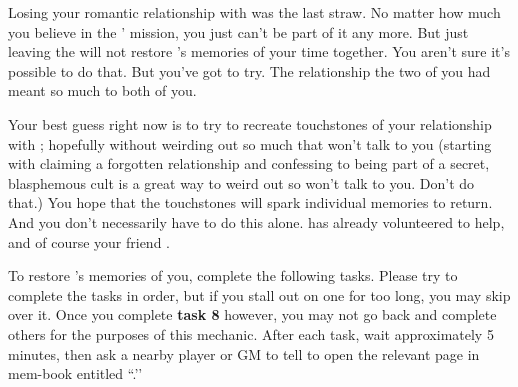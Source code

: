 \documentclass[green]{GL2020}
\begin{document}
\name{\gRestoringLove{}}

Losing your romantic relationship with \cHeadScientist{\full} was the last straw. No matter how much you believe in the \pGoaties{}’ mission, you just can’t be part of it any more. But just leaving the \pGoaties{} will not restore \cHeadScientist{}’s memories of your time together. You aren’t sure it’s possible to do that. But you’ve got to try. The relationship the two of you had meant so much to both of you.

Your best guess right now is to try to recreate touchstones of your relationship with \cHeadScientist{}; hopefully without weirding \cHeadScientist{\them} out so much that \cHeadScientist{\they} won’t talk to you (starting with claiming a forgotten relationship and confessing to being part of a secret, blasphemous cult is a great way to weird \cHeadScientist{\them} out so \cHeadScientist{\they} won’t talk to you. Don’t do that.) You hope that the touchstones will spark individual memories to return. And you don’t necessarily have to do this alone. \cInitiate{\full} has already volunteered \cInitiate{\themself} to help, and of course your friend \cLibrarian{}.

To restore \cHeadScientist{}’s memories of you, complete the following tasks. Please try to complete the tasks in order, but if you stall out on one for too long, you may skip over it. Once you complete \textbf{task 8} however, you may not go back and complete others for the purposes of this mechanic. After each task, wait approximately 5 minutes, then ask a nearby player or GM to tell \cHeadScientist{} to open the relevant page in \cHeadScientist{\their} mem-book entitled ``\mIdleThoughts{}.’’
\end{document}
